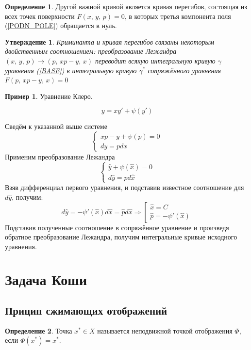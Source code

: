 \documentclass[a4paper,12pt]{article}
\theoremstyle{plain}
\newtheorem{proposition}{Утверждение}[section]
\theoremstyle{definition}
\newtheorem{definition}{Определение}[section]
\newtheorem*{example}{Пример}
\theoremstyle{remark}
\begin{document}
\begin{definition}
	Другой важной кривой является кривая перегибов, состоящая из всех точек поверхности $F(x,\,y,\,p) = 0$, в которых третья компонента поля (\ref*{PODN_POLE}) обращается в нуль.
\end{definition}

\begin{proposition}
	Криминанта и кривая перегибов связаны некоторым двойственным соотношением: преобразование Лежандра $(x,\,y,\,p) \to (p,\, xp - y,\, x)$ переводит всякую интегральную кривую $\gamma$ уравнения (\ref*{BASE}) в интегральную кривую $\gamma^*$ сопряжённого уравнения $F(p,\, xp - y,\, x) = 0$
\end{proposition}

\begin{example}
	Уравнение Клеро.

	\[y = xy' + \psi(y')\]

	Сведём к указанной выше системе
	\[
		\begin{cases}
			xp - y + \psi(p) = 0\\
			dy = pdx
		\end{cases}
	\]
	Применим преобразование Лежандра
	\[
		\begin{cases}
			\hat{y} + \psi(\hat{x}) = 0\\
			d\hat{y} = \hat{p}d\hat{x}
		\end{cases}	
	\]
	Взяв дифференциал первого уравнения, и подставив известное соотношение для $d\hat{y}$, получим:
	\[
		d\hat{y} = -\psi'(\hat{x})d\hat{x} = \hat{p}d\hat{x} \Rightarrow 
	\left[
	\begin{gathered}
		\hat{x} = C\\
		\hat{p} = -\psi'(\hat{x})
	\end{gathered}
	\right.
	\]
	Подставив полученные соотношение в сопряжённое уравнение и произведя обратное преобразование Лежандра, получим интегральные кривые исходного уравнения.
\end{example}

\section{Задача Коши}
\subsection{Прицип сжимающих отображений}
\begin{definition}
	Точка $x^* \in X$ называется неподвижной точкой отображения $\Phi$, если $\Phi(x^*) = x^*$.
\end{definition}
\end{document}
